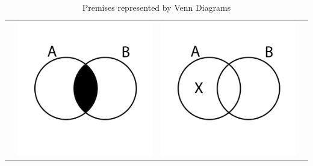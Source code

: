 \documentclass[12pt,a4paper]{report}
\begin{document}
\begin{table}[h!]
\begin{tabular}{  c  c  c  c }
\begin{minipage}{.22\textwidth}
    \end{minipage}
    & 
    \begin{minipage}{.22\textwidth}
      \includegraphics[width=\linewidth]{EVenn}
    \end{minipage}
    &
    \begin{minipage}{.22\textwidth}
      \includegraphics[width=\textwidth]{OVenn}
    \end{minipage}
    \\
  \end{tabular}
  \caption{Premises represented by Venn Diagrams}\label{tbl:eulerPremises}
\end{table}
\end{document}
